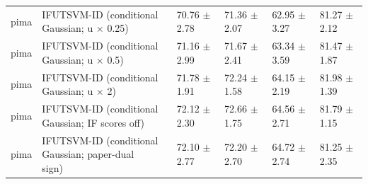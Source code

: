 \begin{table}[!t]
{\begin{tabular}{llllll}
pima & \shortstack[l]{IFUTSVM-ID (conditional\\Gaussian; u \(\times\) 0.25)} & 70.76 \(\pm\) 2.78 & 71.36 \(\pm\) 2.07 & 62.95 \(\pm\) 3.27 & 81.27 \(\pm\) 2.12 \\
pima & \shortstack[l]{IFUTSVM-ID (conditional\\Gaussian; u \(\times\) 0.5)} & 71.16 \(\pm\) 2.99 & 71.67 \(\pm\) 2.41 & 63.34 \(\pm\) 3.59 & 81.47 \(\pm\) 1.87 \\
pima & \shortstack[l]{IFUTSVM-ID (conditional\\Gaussian; u \(\times\) 2)} & 71.78 \(\pm\) 1.91 & 72.24 \(\pm\) 1.58 & 64.15 \(\pm\) 2.19 & 81.98 \(\pm\) 1.39 \\
pima & \shortstack[l]{IFUTSVM-ID (conditional\\Gaussian; IF scores off)} & 72.12 \(\pm\) 2.30 & 72.66 \(\pm\) 1.75 & 64.56 \(\pm\) 2.71 & 81.79 \(\pm\) 1.15 \\
pima & \shortstack[l]{IFUTSVM-ID (conditional\\Gaussian; paper-dual\\sign)} & 72.10 \(\pm\) 2.77 & 72.20 \(\pm\) 2.70 & 64.72 \(\pm\) 2.74 & 81.25 \(\pm\) 2.35 \\
\hline
\end{tabular}%
}
\end{table}

